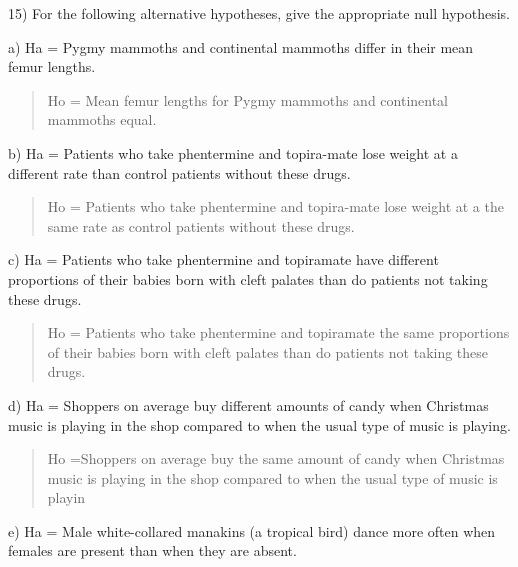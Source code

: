 \documentclass[ignorenonframetext,]{beamer}
\begin{document}
\begin{frame}{15) For the following alternative hypotheses, give the
appropriate null hypothesis.}

\begin{block}{a) Ha = Pygmy mammoths and continental mammoths differ in
their mean femur lengths.}

\begin{quote}
Ho = Mean femur lengths for Pygmy mammoths and continental mammoths
equal.
\end{quote}

\end{block}

\begin{block}{b) Ha = Patients who take phentermine and topira-mate lose
weight at a different rate than control patients without these drugs.}

\begin{quote}
Ho = Patients who take phentermine and topira-mate lose weight at a the
same rate as control patients without these drugs.
\end{quote}

\end{block}

\begin{block}{c) Ha = Patients who take phentermine and topiramate have
different proportions of their babies born with cleft palates than do
patients not taking these drugs.}

\begin{quote}
Ho = Patients who take phentermine and topiramate the same proportions
of their babies born with cleft palates than do patients not taking
these drugs.
\end{quote}

\end{block}

\begin{block}{d) Ha = Shoppers on average buy different amounts of candy
when Christmas music is playing in the shop compared to when the usual
type of music is playing.}

\begin{quote}
Ho =Shoppers on average buy the same amount of candy when Christmas
music is playing in the shop compared to when the usual type of music is
playin
\end{quote}

\end{block}

\begin{block}{e) Ha = Male white-collared manakins (a tropical bird)
dance more often when females are present than when they are absent.}


\end{block}
\end{frame}
\end{document}
